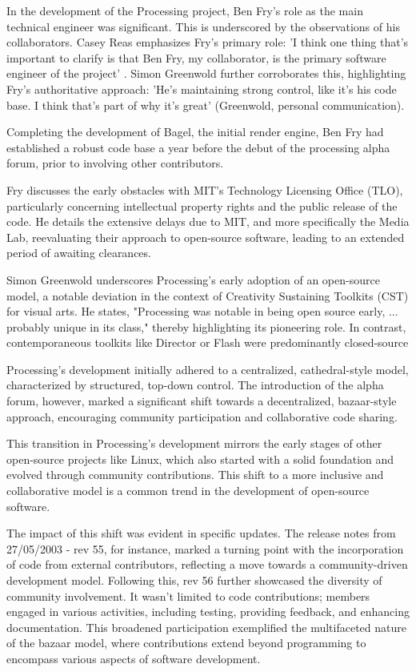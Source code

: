 
In the development of the Processing project, Ben Fry's role as the main technical engineer was significant. This is underscored by the observations of his collaborators. Casey Reas emphasizes Fry's primary role: 'I think one thing that’s important to clarify is that Ben Fry, my collaborator, is the primary software engineer of the project' \parencite[p. 330]{conradGraphicDesignPostdigital2021}. Simon Greenwold further corroborates this, highlighting Fry's authoritative approach: 'He's maintaining strong control, like it's his code base. I think that's part of why it's great' (Greenwold, personal communication).

Completing the development of Bagel, the initial render engine, Ben Fry had established a robust code base a year before the debut of the processing alpha forum, prior to involving other contributors.

Fry discusses the early obstacles with MIT's Technology Licensing Office (TLO), particularly concerning intellectual property rights and the public release of the code. He details the extensive delays due to MIT, and more specifically the Media Lab, reevaluating their approach to open-source software, leading to an extended period of awaiting clearances.

Simon Greenwold underscores Processing's early adoption of an open-source model, a notable deviation in the context of Creativity Sustaining Toolkits (CST) for visual arts. He states, "Processing was notable in being open source early, ... probably unique in its class," thereby highlighting its pioneering role. In contrast, contemporaneous toolkits like Director or Flash were predominantly closed-source

Processing's development initially adhered to a centralized, cathedral-style model, characterized by structured, top-down control. The introduction of the alpha forum, however, marked a significant shift towards a decentralized, bazaar-style approach, encouraging community participation and collaborative code sharing.

This transition in Processing's development mirrors the early stages of other open-source projects like Linux, which also started with a solid foundation and evolved through community contributions. This shift to a more inclusive and collaborative model is a common trend in the development of open-source software.

The impact of this shift was evident in specific updates. The release notes from 27/05/2003 - rev 55, for instance, marked a turning point with the incorporation of code from external contributors, reflecting a move towards a community-driven development model. Following this, rev 56 further showcased the diversity of community involvement. It wasn't limited to code contributions; members engaged in various activities, including testing, providing feedback, and enhancing documentation. This broadened participation exemplified the multifaceted nature of the bazaar model, where contributions extend beyond programming to encompass various aspects of software development.

